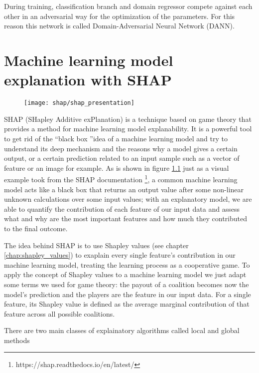 \documentclass[11pt]{report}
\begin{document}
During training, classification branch and domain regressor compete against each other in an adversarial way for the optimization of the parameters. For this reason this network is called Domain-Adversarial Neural Network (DANN).



\chapter{Machine learning model explanation with SHAP}\label{chap:shap}


\begin{figure}[h]
\centering
\texttt{[image: shap/shap\_presentation]}
\caption{}
\label{fig:shap_waterfall_example}
\end{figure}

SHAP (SHapley Additive exPlanation) is a technique based on game theory that provides a method for machine learning model explanability.
It is a powerful tool to get rid of the \textquotedblleft black box \textquotedblright idea of a machine learning model and try to understand its deep mechanism and the reasons why a model gives a certain output, or a certain prediction related to an input sample such as a vector of feature or an image for example.
As is shown in figure \ref{fig:shap_waterfall_example} just as a visual example took from the SHAP documentation \footnote{https://shap.readthedocs.io/en/latest/}, a common machine learning model acts like a black box that returns an output value after some non-linear unknown calculations over some input values; with an explanatory model, we are able to quantify the contribution of each feature of our input data and assess what and why are the most important features and how much they contributed to the final outcome.

The idea behind SHAP is to use Shapley values (see chapter \ref{chap:shapley_values}) to exaplain every single feature's contribution in our machine learning model, treating the learning process as a cooperative game.
To apply the concept of Shapley values to a machine learning model we just adapt some terms we used for game theory: the payout of a coalition becomes now the model's prediction and the players are the feature in our input data.
For a single feature, its Shapley value is defined as the average marginal contribution of that feature across all possible coalitions.

There are two main classes of explainatory algorithms called local and global methods
\end{document}

